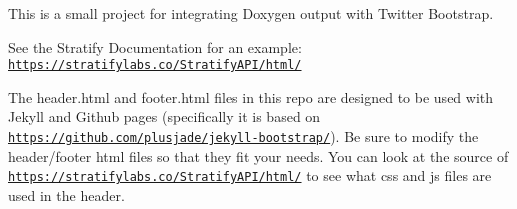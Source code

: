 This is a small project for integrating Doxygen output with Twitter Bootstrap.

See the Stratify Documentation for an example\+: \href{https://stratifylabs.co/StratifyAPI/html/}{\tt https\+://stratifylabs.\+co/\+Stratify\+A\+P\+I/html/}

The header.\+html and footer.\+html files in this repo are designed to be used with Jekyll and Github pages (specifically it is based on \href{https://github.com/plusjade/jekyll-bootstrap/}{\tt https\+://github.\+com/plusjade/jekyll-\/bootstrap/}). Be sure to modify the header/footer html files so that they fit your needs. You can look at the source of \href{https://stratifylabs.co/StratifyAPI/html/}{\tt https\+://stratifylabs.\+co/\+Stratify\+A\+P\+I/html/} to see what css and js files are used in the header. 